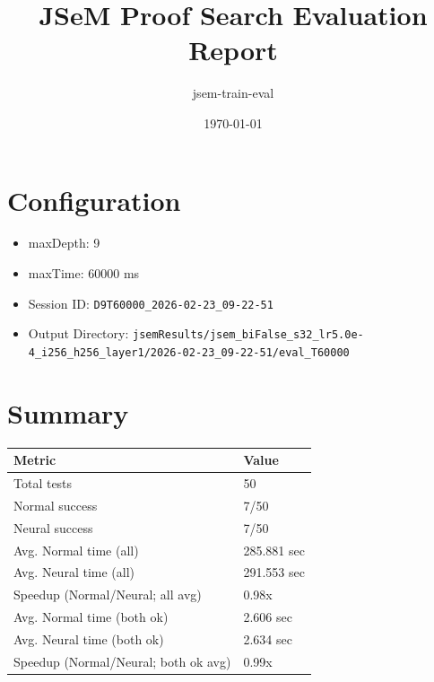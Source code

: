 \documentclass[a4paper,10pt]{article}
\title{JSeM Proof Search Evaluation Report}
\author{jsem-train-eval}
\date{\today}
\begin{document}
\maketitle

\section{Configuration}
\begin{itemize}
\item maxDepth: 9
\item maxTime: 60000 ms
\item Session ID: \texttt{D9T60000\_2026-02-23\_09-22-51}
\item Output Directory: \texttt{jsemResults/jsem\_biFalse\_s32\_lr5.0e-4\_i256\_h256\_layer1/2026-02-23\_09-22-51/eval\_T60000}
\end{itemize}

\section{Summary}
\begin{tabular}{ll}
\toprule
\textbf{Metric} & \textbf{Value} \\
\midrule
Total tests & 50 \\
Normal success & 7/50 \\
Neural success & 7/50 \\
\midrule
Avg. Normal time (all) & 285.881 sec \\
Avg. Neural time (all) & 291.553 sec \\
Speedup (Normal/Neural; all avg) & 0.98x \\
Avg. Normal time (both ok) & 2.606 sec \\
Avg. Neural time (both ok) & 2.634 sec \\
Speedup (Normal/Neural; both ok avg) & 0.99x \\
\bottomrule
\end{tabular}
\end{document}
